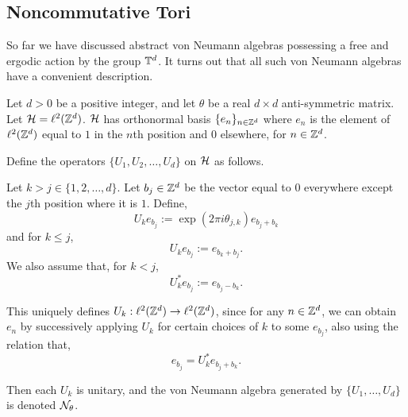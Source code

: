 \subsection{Noncommutative Tori}
So far we have discussed abstract von Neumann algebras
possessing a free and ergodic action by the group $\mathbb{T}^d$. It turns
out that all such von Neumann algebras have a convenient description. 

\begin{definition}
\label{ncTorus}
    Let $d > 0$ be a positive integer, and let $\theta$ be a
    real $d\times d$ anti-symmetric matrix. Let $\mathcal{H} = \ell^2(\mathbb{Z}^d)$.
    $\mathcal{H}$ has orthonormal basis $\{e_n\}_{n \in \mathbb{Z}^d}$
    where $e_n$ is the element of $\ell^2(\mathbb{Z}^d)$ equal to $1$
    in the $n$th position and $0$ elsewhere, for $n \in \mathbb{Z}^d$. 
    
     Define
    the operators $\{U_1,U_2,\ldots,U_d\}$ on $\mathcal{H}$ as follows.
    
    Let $k > j \in \{1,2,\ldots,d\}$. Let $b_j \in \mathbb{Z}^d$
    be the vector equal to $0$ everywhere except the $j$th position
    where it is $1$. Define,
    \begin{equation}
        U_k e_{b_j} := \exp(2\pi i\theta_{j,k})e_{b_j+b_k}
    \end{equation}
    and for $k \leq j$,
    \begin{equation}
        U_k e_{b_j} := e_{b_k+b_j}.
    \end{equation}
    We also assume that, for $k < j$,
    \begin{equation}
        U_k^*e_{b_j} := e_{b_j-b_k}.
    \end{equation}
    
    This uniquely defines $U_k:\ell^2(\mathbb{Z}^d) \to \ell^2(\mathbb{Z}^d)$, 
    since for any $n \in \mathbb{Z}^d$, we can obtain $e_n$
    by successively applying $U_k$ for certain
    choices of $k$ to some $e_{b_j}$, also using the relation that,
    \begin{equation}
        e_{b_j} = U_k^*e_{b_j+b_k}.
    \end{equation}
    
    Then each $U_k$ is unitary, and the
    von Neumann algebra generated by $\{U_1,\ldots,U_d\}$ is denoted
    $\mathcal{N}_\theta$.
\end{definition}


